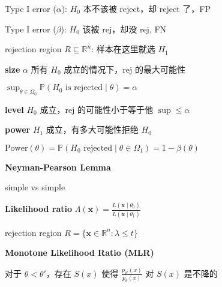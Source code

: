 \documentclass[9pt,landscape]{article}
\begin{document}
\begin{multicols}{3}
Type I error ($\alpha$): $H_0$ 本不该被 reject，却 reject 了，FP

Type I error ($\beta$): $H_0$ 该被 rej，却没 rej, FN

rejection region $R\subseteq \mathbb{R}^n$: 样本在这里就选 $H_1$

\textbf{size} $\alpha$ 所有 $H_0$ 成立的情况下，rej 的最大可能性

$\sup_{\theta\in\Omega_0}\mathbb{P}(H_0 \text{ is rejected}\mid\theta)=\alpha$

\textbf{level} $H_0$ 成立，rej 的可能性小于等于他 $\sup\le\alpha$

\textbf{power} $H_1$ 成立，有多大可能性拒绝 $H_0$

$\mathrm{Power}(\theta)=\mathbb{P}(H_0\text{ rejected}\mid\theta\in\Omega_1)=1-\beta(\theta)$

\textbf{Neyman-Pearson Lemma}

simple vs simple

\textbf{Likelihood ratio} $\Lambda(\boldsymbol{x})=\frac{L(\boldsymbol{x}\mid\theta_0)}{L(\boldsymbol{x}\mid\theta_1)}$

rejection region $R = \{\boldsymbol{x}\in\mathbb{R}^n: \lambda\le t\}$

\textbf{Monotone Likelihood Ratio (MLR)}

对于 $\theta<\theta'$，存在 $S(x)$ 使得 $\frac{p_{\theta'}(x)}{p_\theta(x)}$ 对 $S(x)$ 是不降的

\end{multicols}
\end{document}
